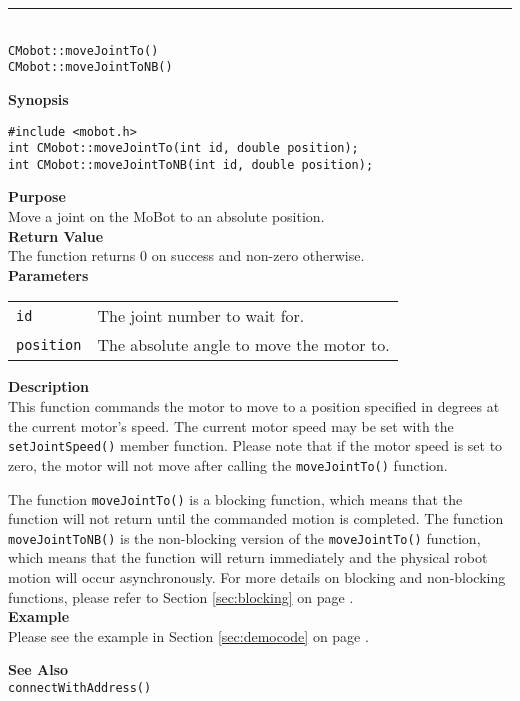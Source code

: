 \noindent
\vspace{5pt}
\rule{4.5in}{0.015in}\\
\noindent
{\LARGE \texttt{CMobot::moveJointTo()}}\\
{\LARGE \texttt{CMobot::moveJointToNB()}}\\
{}

\noindent
{\bf Synopsis}\\
\begin{verbatim}
#include <mobot.h>
int CMobot::moveJointTo(int id, double position);
int CMobot::moveJointToNB(int id, double position);
\end{verbatim}

\noindent
{\bf Purpose}\\
Move a joint on the MoBot to an absolute position.\\

\noindent
{\bf Return Value}\\
The function returns 0 on success and non-zero otherwise.\\

\noindent
{\bf Parameters}\\
\vspace{-0.1in}
\begin{description}
\item               
\begin{tabular}{p{10 mm}p{145 mm}}
\texttt{id} & The joint number to wait for. \\
\texttt{position} & The absolute angle to move the motor to.  \\
\end{tabular}
\end{description}

\noindent
{\bf Description}\\
This function commands the motor to move to a position specified in degrees at
the current motor's speed. The current motor speed may be set with the
\texttt{setJointSpeed()} member function. Please note that if the motor speed
is set to zero, the motor will not move after calling the
\texttt{moveJointTo()} function. 

The function \texttt{moveJointTo()} is a blocking function, which means that 
the function will not return until the commanded motion is 
completed. The function \texttt{moveJointToNB()} is the non-blocking version of
the \texttt{moveJointTo()} function, which means that the function will return
immediately and the physical robot motion will occur asynchronously. For
more details on blocking and non-blocking functions, please refer to 
Section \ref{sec:blocking} on page \pageref{sec:blocking}.\\

\noindent
{\bf Example}\\
Please see the example in Section \ref{sec:democode} on page \pageref{sec:democode}.\\
\noindent

\noindent
{\bf See Also}\\
\texttt{connectWithAddress()}

